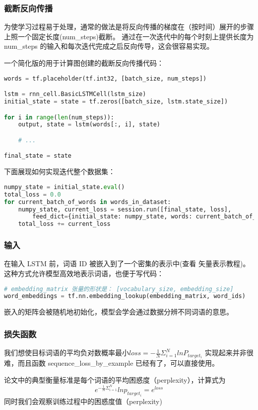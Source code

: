 \subsubsection{截断反向传播}
为使学习过程易于处理，通常的做法是将反向传播的梯度在（按时间）展开的步骤上照一个固定长度(num\_steps)截断。 通过在一次迭代中的每个时刻上提供长度为 num\_steps 的输入和每次迭代完成之后反向传导，这会很容易实现。

一个简化版的用于计算图创建的截断反向传播代码：
\begin{lstlisting}[language=Python]
words = tf.placeholder(tf.int32, [batch_size, num_steps])

lstm = rnn_cell.BasicLSTMCell(lstm_size)
initial_state = state = tf.zeros([batch_size, lstm.state_size])

for i in range(len(num_steps)):
    output, state = lstm(words[:, i], state)

    # ...

final_state = state
\end{lstlisting}
下面展现如何实现迭代整个数据集：
\begin{lstlisting}[language=Python]
numpy_state = initial_state.eval()
total_loss = 0.0
for current_batch_of_words in words_in_dataset:
    numpy_state, current_loss = session.run([final_state, loss],
        feed_dict={initial_state: numpy_state, words: current_batch_of_words})
    total_loss += current_loss
\end{lstlisting}
\subsubsection{输入}
在输入 LSTM 前，词语 ID 被嵌入到了一个密集的表示中(查看 矢量表示教程)。这种方式允许模型高效地表示词语，也便于写代码：
\begin{lstlisting}[language=Python]
# embedding_matrix 张量的形状是： [vocabulary_size, embedding_size]
word_embeddings = tf.nn.embedding_lookup(embedding_matrix, word_ids)
\end{lstlisting}
嵌入的矩阵会被随机地初始化，模型会学会通过数据分辨不同词语的意思。
\subsubsection{损失函数}
我们想使目标词语的平均负对数概率最小$loss = -\frac{1}{N}\Sigma_{i=1}^NlnP_{target_i}$
实现起来并非很难，而且函数 sequence\_loss\_by\_example 已经有了，可以直接使用。

论文中的典型衡量标准是每个词语的平均困惑度（perplexity），计算式为
$$e^{-\frac{1}{N}\Sigma_{i=1}^N}lnp_{target_i}=e^{loss}$$
同时我们会观察训练过程中的困惑度值（perplexity)
